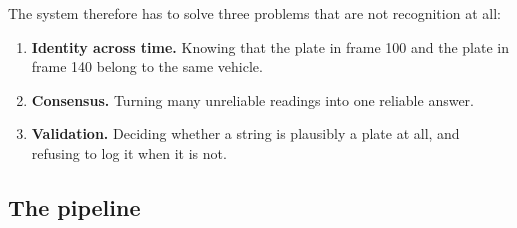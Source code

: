 \documentclass[11pt,a4paper]{article}
\begin{document}
The system therefore has to solve three problems that are not recognition at all:

\begin{enumerate}[leftmargin=*]
  \item \textbf{Identity across time.} Knowing that the plate in frame 100 and
        the plate in frame 140 belong to the same vehicle.
  \item \textbf{Consensus.} Turning many unreliable readings into one reliable
        answer.
  \item \textbf{Validation.} Deciding whether a string is plausibly a plate at
        all, and refusing to log it when it is not.
\end{enumerate}

\subsection{The pipeline}
\end{document}
